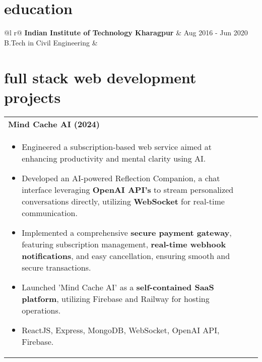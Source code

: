 \documentclass[a4paper,8pt]{article}
\begin{document}
\vspace{4 pt}

\section{education}
\begin{tabularx}{\linewidth}{ @{}l r@{} }
\color[HTML]{1C033C} \textbf{Indian Institute of Technology Kharagpur} & \hfill \color[HTML]{371e77} Aug 2016 - Jun 2020 \\
\color[HTML]{371e77} B.Tech in Civil Engineering & \hfill \color[HTML]{4B28A4} \textit{\textbf{}} \\
\end{tabularx}

\vspace{-8pt}

\section{full stack web development projects}
\begin{tabularx}{\linewidth}{ @{}l r@{} }
\textbf{{Mind Cache AI (2024)}} \hfill \color[HTML]{371e77} \\[1pt]
\begin{minipage}[t]{\linewidth}
    \begin{itemize}[nosep,after=\strut, leftmargin=2em, itemsep=2pt]
        \item Engineered a subscription-based web service aimed at enhancing productivity and mental clarity using AI.
        \item Developed an AI-powered Reflection Companion, a chat interface leveraging \textbf{OpenAI API's} to stream personalized conversations directly, utilizing \textbf{WebSocket} for real-time communication.
        \item Implemented a comprehensive \textbf{secure payment gateway}, featuring subscription management, \textbf{real-time webhook notifications}, and easy cancellation, ensuring smooth and secure transactions.
        \item Launched 'Mind Cache AI' as a \textbf{self-contained SaaS platform}, utilizing Firebase and Railway for hosting operations.
        \item ReactJS, Express, MongoDB, WebSocket, OpenAI API, Firebase.
    \end{itemize}
\end{minipage}
\end{tabularx}
\end{document}
